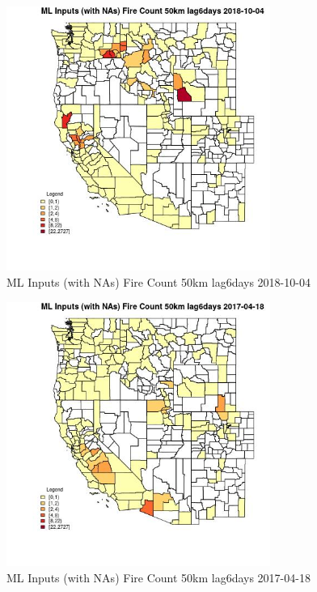 \begin{figure} 
\centering  
\includegraphics[width=0.77\textwidth]{Code_Outputs/Report_ML_input_PM25_Step4_part_f_de_duplicated_aveswNAs_CountyFire_Count_50km_lag6daysMean2018-10-04.jpg} 
\caption{\label{fig:Report_ML_input_PM25_Step4_part_f_de_duplicated_aveswNAsCountyFire_Count_50km_lag6daysMean2018-10-04}ML Inputs (with NAs) Fire Count 50km lag6days 2018-10-04} 
\end{figure} 
 

\begin{figure} 
\centering  
\includegraphics[width=0.77\textwidth]{Code_Outputs/Report_ML_input_PM25_Step4_part_f_de_duplicated_aveswNAs_CountyFire_Count_50km_lag6daysMean2017-04-18.jpg} 
\caption{\label{fig:Report_ML_input_PM25_Step4_part_f_de_duplicated_aveswNAsCountyFire_Count_50km_lag6daysMean2017-04-18}ML Inputs (with NAs) Fire Count 50km lag6days 2017-04-18} 
\end{figure} 
 

